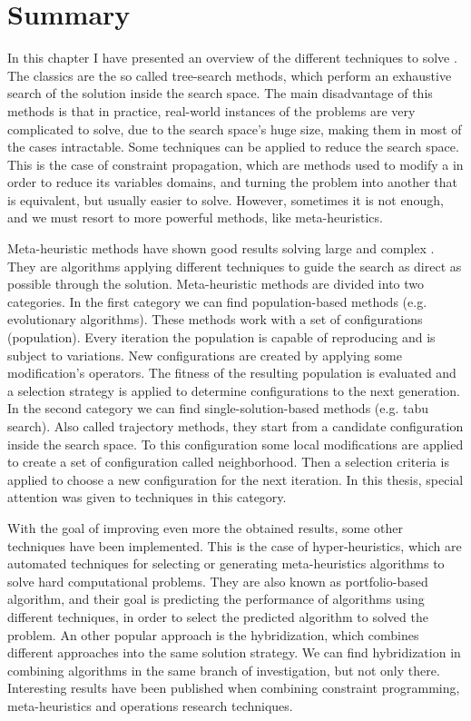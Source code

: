 \section{Summary}

In this chapter I have presented an overview of the different techniques to solve \CSPs{}. %
The classics are the so called tree-search methods, which perform an exhaustive search of the solution inside the search space. The main disadvantage of this methods is that in practice, real-world instances of the problems are very complicated to solve, due to the search space's huge size, making them in most of the cases intractable. Some techniques can be applied to reduce the search space. This is the case of constraint propagation, which are methods used to modify a \csp{} in order to reduce its variables domains, and turning the problem into another that is equivalent, but usually easier to solve. However, sometimes it is not enough, and we must resort to more powerful methods, like meta-heuristics. 

Meta-heuristic methods have shown good results solving large and complex \csps. They are algorithms applying different techniques to guide the search as direct as possible through the solution. Meta-heuristic methods are divided into two categories. In the first category we can find population-based methods (e.g. evolutionary algorithms). These methods work with a set of configurations (population). Every iteration the population is capable of reproducing and is subject to variations. New configurations are created by applying some modification's operators. The fitness of the resulting population is evaluated and a selection strategy is applied to determine configurations to the next generation. In the second category we can find single-solution-based methods (e.g. tabu search). Also called trajectory methods, they start from a candidate configuration inside the search space. To this configuration some local modifications are applied to create a set of configuration called neighborhood. Then a selection criteria is applied to choose a new configuration for the next iteration. In this thesis, special attention was given to techniques in this category.

With the goal of improving even more the obtained results, some other techniques have been implemented. This is the case of hyper-heuristics, which are automated techniques for selecting or generating meta-heuristics algorithms to solve hard computational problems. They are also known as portfolio-based algorithm, and their goal is predicting the performance of algorithms using different techniques, in order to select the predicted algorithm to solved the problem. An other popular approach is the hybridization, which combines different approaches into the same solution strategy. We can find hybridization in combining algorithms in the same branch of investigation, but not only there. Interesting results have been published when combining constraint programming, meta-heuristics and operations research techniques.

